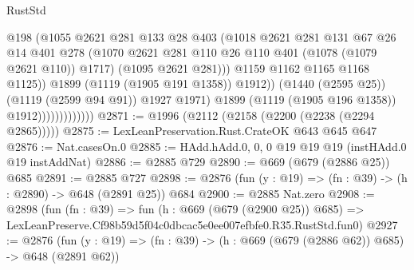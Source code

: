\begin{lexlean}{RustStd}
\begin{coremodule}
                                        @198
                                        (@1055
                                          @2621
                                          @281
                                          @133
                                          @28
                                          @403
                                          (@1018
                                            @2621
                                            @281
                                            @131
                                            @67
                                            @26
                                            @14
                                            @401
                                            @278
                                            (@1070
                                              @2621
                                              @281
                                              @110
                                              @26
                                              @110
                                              @401
                                              (@1078 (@1079 @2621 @110))
                                              @1717)
                                            (@1095 @2621 @281)))
                                        @1159
                                        @1162
                                        @1165
                                        @1168
                                        @1125))
                                    @1899
                                    (@1119 (@1905 @191 @1358))
                                    @1912))
                                (@1440 (@2595 @25))
                                (@1119 (@2599 @94 @91))
                                @1927
                                @1971)
                              @1899
                              (@1119 (@1905 @196 @1358))
                              @1912)))))))))))))
@2871 := @1996 (@2112 (@2158 (@2200 (@2238 (@2294 @2865)))))
@2875 := LexLeanPreservation.Rust.CrateOK @643 @645 @647
@2876 := Nat.casesOn.{0}
@2885 := HAdd.hAdd.{0, 0, 0} @19 @19 @19 (instHAdd.{0} @19 instAddNat)
@2886 := @2885 @729
@2890 := @669 (@679 (@2886 @25)) @685
@2891 := @2885 @727
@2898 := @2876 (fun (y : @19) => (fn : @39) -> (h : @2890) -> @648 (@2891 @25)) @684
@2900 := @2885 Nat.zero
@2908 := @2898
    (fun (fn : @39) =>
    fun (h : @669 (@679 (@2900 @25)) @685) =>
    LexLeanPreserve.Cf98b59d5f04c0dbcac5e0ee007efbfe0.R35.RustStd.fun0)
@2927 := @2876
    (fun (y : @19) => (fn : @39) -> (h : @669 (@679 (@2886 @62)) @685) -> @648 (@2891 @62))

\end{coremodule}
\end{lexlean}
